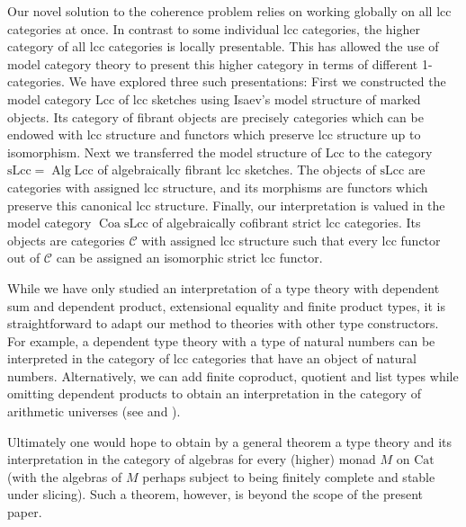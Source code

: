 \documentclass[a4paper]{article}
\theoremstyle{remark}
\theoremstyle{definition}
\begin{document}
Our novel solution to the coherence problem relies on working globally on all lcc categories at once.
In contrast to some individual lcc categories, the higher category of all lcc categories is locally presentable.
This has allowed the use of model category theory to present this higher category in terms of different 1-categories.
We have explored three such presentations:
First we constructed the model category $\mathrm{Lcc}$ of lcc sketches using Isaev's model structure of marked objects.
Its category of fibrant objects are precisely categories which can be endowed with lcc structure and functors which preserve lcc structure up to isomorphism.
Next we transferred the model structure of $\mathrm{Lcc}$ to the category $\mathrm{sLcc} = \operatorname{Alg} \mathrm{Lcc}$ of algebraically fibrant lcc sketches.
The objects of $\mathrm{sLcc}$ are categories with assigned lcc structure, and its morphisms are functors which preserve this canonical lcc structure.
Finally, our interpretation is valued in the model category $\operatorname{Coa} \mathrm{sLcc}$ of algebraically cofibrant strict lcc categories.
Its objects are categories $\mathcal{C}$ with assigned lcc structure such that every lcc functor out of $\mathcal{C}$ can be assigned an isomorphic strict lcc functor.

While we have only studied an interpretation of a type theory with dependent sum and dependent product, extensional equality and finite product types, it is straightforward to adapt our method to theories with other type constructors.
For example, a dependent type theory with a type of natural numbers can be interpreted in the category of lcc categories that have an object of natural numbers.
Alternatively, we can add finite coproduct, quotient and list types while omitting dependent products to obtain an interpretation in the category of arithmetic universes (see \cite{au-as-list-arithmetic-pretopos} and \cite{au-sketches}).

Ultimately one would hope to obtain by a general theorem a type theory and its interpretation in the category of algebras for every (higher) monad $M$ on $\mathrm{Cat}$ (with the algebras of $M$ perhaps subject to being finitely complete and stable under slicing).
Such a theorem, however, is beyond the scope of the present paper.




\end{document}
